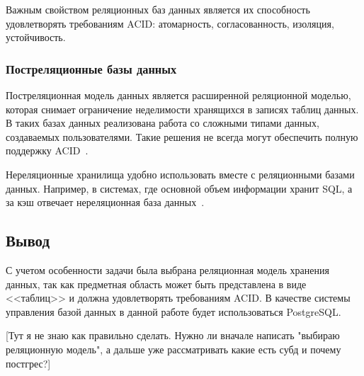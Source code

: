 Важным свойством реляционных баз данных является их способность удовлетворять требованиям ACID: атомарность, согласованность, изоляция, устойчивость.
 
\subsubsection{Постреляционные базы данных}

Постреляционная модель данных является расширенной реляционной моделью, которая снимает ограничение неделимости хранящихся в записях таблиц данных. В таких базах данных реализована работа со сложными типами данных, создаваемых пользователями. Такие решения не всегда могут обеспечить полную поддержку ACID~\cite{acid}. 

Нереляционные хранилища удобно использовать вместе с реляционными базами данных. Например, в системах, где основной объем информации хранит SQL, а за кэш отвечает нереляционная база данных~\cite{amazon}.

\subsection*{Вывод}

С учетом особенности задачи была выбрана реляционная модель хранения данных, так как предметная область может быть представлена в виде <<таблиц>> и должна удовлетворять требованиям ACID. В качестве системы управления базой данных в данной работе будет использоваться PostgreSQL.


[Тут я не знаю как правильно сделать. Нужно ли вначале написать "выбираю реляционную модель",  а дальше уже рассматривать какие есть субд и почему постгрес?]
